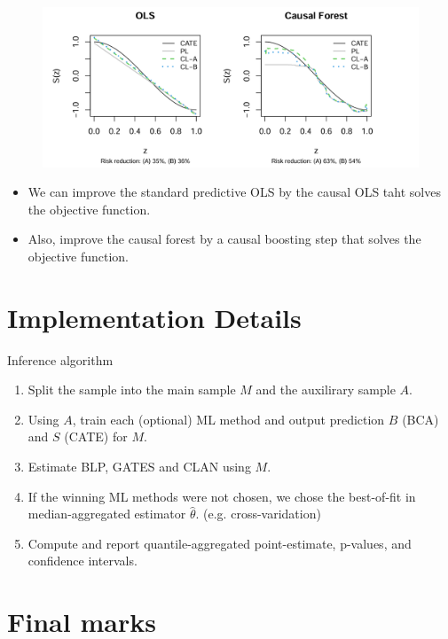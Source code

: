 \documentclass[xcolor=svgnames,aspectratio=169]{beamer}
\begin{document}
\begin{frame}
    \begin{figure}
        \includegraphics[width=1.5\textwidth, height=0.6\textheight, keepaspectratio]{PLvsCL(OLS,CF).png}
    \end{figure}
    \begin{itemize}
        \item We can improve the standard predictive OLS by the causal OLS taht solves the objective function.
        \item Also, improve the causal forest by a causal boosting step that solves the objective function.
    \end{itemize}
\end{frame}

\section{Implementation Details}

\begin{frame}{Inference algorithm}
    \begin{enumerate}
        \item Split the sample into the main sample $M$ and the auxilirary sample $A$.
        \item Using $A$, train each (optional) ML method and output prediction $B$ (BCA) and $S$ (CATE) for $M$.
        \item Estimate BLP, GATES and CLAN using $M$.
        \item If the winning ML methods were not chosen, we chose the best-of-fit in median-aggregated estimator $\hat{\theta}$. (e.g. cross-varidation)
        \item Compute and report quantile-aggregated point-estimate, p-values, and confidence intervals.
    \end{enumerate}
\end{frame}

\section{Final marks}
\end{document}
